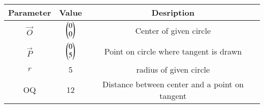 
\begin{tabular}[]{|c|c|c|}
\hline
Parameter	& Value	& Desription \\ \hline
$\vec{O}$	& $\begin{pmatrix}0\\0\end{pmatrix}$ & Center of given circle\\ \hline
$\vec{P}$	& $\begin{pmatrix}0\\5\end{pmatrix}$ & Point on circle where tangent is drawn\\ \hline
$r$		& 5 & radius of given circle\\ \hline
OQ & 12 & Distance between center and a point on tangent\\ \hline
\end{tabular}

